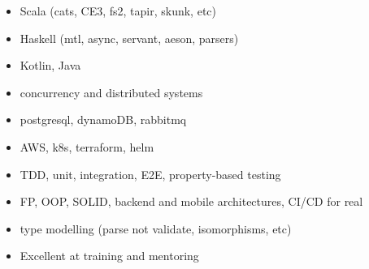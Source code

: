 \setlength{\columnsep}{-1.0cm}
 \begin{multicols}{2}
    \begin{itemize}
      \item Scala (cats, CE3, fs2, tapir, skunk, etc)
      \item Haskell (mtl, async, servant, aeson, parsers)
      \item Kotlin, Java
      \item concurrency and distributed systems 
        \item postgresql, dynamoDB, rabbitmq
        \item AWS, k8s, terraform, helm 
	    \item TDD, unit, integration, E2E, property-based testing %
	    \item FP, OOP, SOLID, backend and mobile architectures,
	    CI/CD for real 
      \item type modelling (parse not validate, isomorphisms, etc)
	    \item Excellent at training and mentoring 
    \end{itemize}
 \end{multicols}
